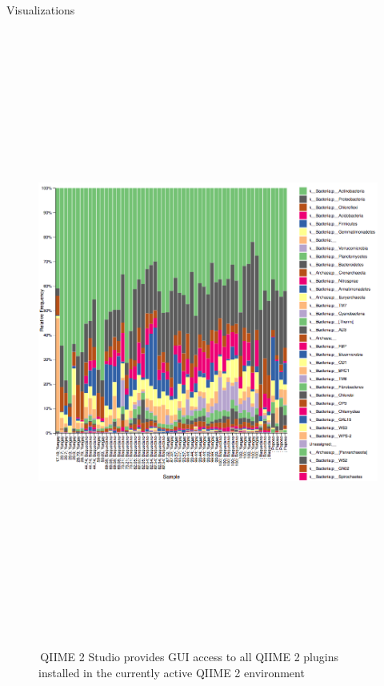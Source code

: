 \documentclass[final]{beamer}
\newlength{\colwidth}
\begin{document}
\begin{frame}[t]
\begin{columns}[t]
\begin{column}{\colwidth}
\begin{block}{Visualizations}
    \begin{figure}[tph!]
      {\includegraphics[height=20cm]{assets/taxabar-plot}}
      \caption{\,QIIME 2 Studio provides GUI access to all QIIME 2 plugins installed in the currently active QIIME 2 environment}
      \label{fig:q2studio}
    \end{figure}


\end{block}
\end{column}
\end{columns}
\end{frame}
\end{document}
